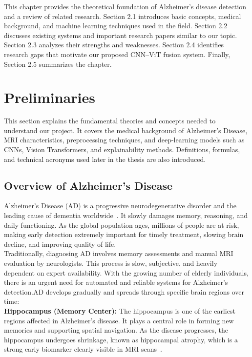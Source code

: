 This chapter provides the theoretical foundation of Alzheimer’s disease detection and a review of related research. Section 2.1 introduces basic concepts, medical background, and machine learning techniques used in the field. Section 2.2 discusses existing systems and important research papers similar to our topic. Section 2.3 analyzes their strengths and weaknesses. Section 2.4 identifies research gaps that motivate our proposed CNN–ViT fusion system. Finally, Section 2.5 summarizes the chapter.

\section{Preliminaries}
This section explains the fundamental theories and concepts needed to understand our project. It covers the medical background of Alzheimer’s Disease, MRI characteristics, preprocessing techniques, and deep-learning models such as CNNs, Vision Transformers, and explainability methods. Definitions, formulas, and technical acronyms used later in the thesis are also introduced.

\subsection{Overview of Alzheimer’s Disease}
Alzheimer’s Disease (AD) is a progressive neurodegenerative disorder and the leading cause of dementia worldwide~\cite{scheltens2016alzheimer,mckhann2011diagnosis}. It slowly damages memory, reasoning, and daily functioning. As the global population ages, millions of people are at risk, making early detection extremely important for timely treatment, slowing brain decline, and improving quality of life. \\
Traditionally, diagnosing AD involves memory assessments and manual MRI evaluation by neurologists. This process is slow, subjective, and heavily dependent on expert availability. With the growing number of elderly individuals, there is an urgent need for automated and reliable systems for Alzheimer’s detection.AD develops gradually and spreads through specific brain regions over time: \\
\textbf{Hippocampus (Memory Center):} 
The hippocampus is one of the earliest regions affected in Alzheimer’s disease. It plays a central role in forming new memories and supporting spatial navigation. As the disease progresses, the hippocampus undergoes shrinkage, known as hippocampal atrophy, which is a strong early biomarker clearly visible in MRI scans~\cite{frisoni2010clinical,braak1991neuropathological}.

